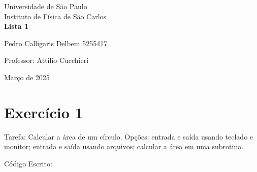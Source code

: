\documentclass[12pt, a4paper]{article} %
\begin{document}
	
	\begin{titlepage}
		\begin{center}
\Huge{Universidade de São Paulo}\\
\large{Instituto de Física de São Carlos}\\
\vspace{20pt}
\vspace{200pt}
\textbf{Lista 1}\\
\vspace{8cm}
		\end{center}

\begin{flushleft}
\begin{tabbing}
Pedro Calligaris Delbem 5255417\\
\end{tabbing}
\vspace{0.5cm}
Professor: Attilio Cucchieri\\		
		\end{flushleft}
	
		\begin{center}
			\vspace{\fill}
	Março de 2025	
		\end{center}
	\end{titlepage}

	\tableofcontents 
	\thispagestyle{empty}
	\newpage
\section{Exerc\'icio 1}

    Tarefa: Calcular a \'area de um c\'irculo. Op\c{c}\~oes: entrada e sa\'ida usando teclado e monitor; entrada e sa\'ida usando arquivos; calcular a  \'area em uma subrotina.

    C\'odigo Escrito:
    
\end{document}
